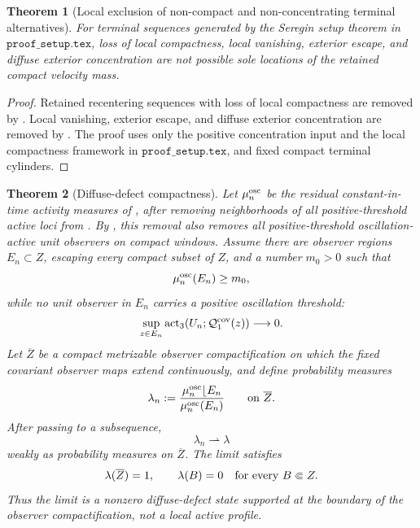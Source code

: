 \documentclass[11pt]{amsart}
\numberwithin{equation}{section}
\theoremstyle{plain}
\newtheorem{theorem}{Theorem}[section]
\theoremstyle{definition}
\theoremstyle{remark}
\newcommand{\actthree}{\operatorname{act}_3}
\begin{document}
\begin{theorem}[Local exclusion of non-compact and non-concentrating terminal alternatives]
\label{thm:terminal-nonactive-discharge}
For terminal sequences generated by the Seregin setup theorem in
\(\texttt{proof\_setup.tex}\), loss of local compactness, local vanishing,
exterior escape, and
diffuse exterior concentration are not possible sole locations of the retained
compact velocity mass.
\end{theorem}

\begin{proof}
Retained recentering sequences with loss of local compactness are removed by
.  Local vanishing, exterior escape, and
diffuse exterior concentration are removed by
.  The proof uses only the positive
concentration input and the local compactness framework in
\(\texttt{proof\_setup.tex}\), and fixed compact terminal cylinders.
\end{proof}

\begin{theorem}[Diffuse-defect compactness]
\label{thm:diffuse-defect-compactness}
Let \(\mu_n^{\rm osc}\) be the residual constant-in-time activity measures
of , after removing neighborhoods of all
positive-threshold active loci from .  By
, this removal also removes all
positive-threshold oscillation-active unit observers on compact windows.
Assume there are observer regions \(E_n\subset Z\), escaping every compact
subset of \(Z\), and a number \(m_0>0\) such that
\[
   \mu_n^{\rm osc}(E_n)\ge m_0 ,
\]
while no unit observer in \(E_n\) carries a positive oscillation threshold:
\[
   \sup_{z\in E_n}
      \actthree(U_n;\mathcal Q_1^{\rm cov}(z))
   \longrightarrow0 .
\]
Let \(\overline Z\) be a compact metrizable observer compactification on which
the fixed covariant observer maps extend continuously, and define probability
measures
\[
   \lambda_n
   :=
   \frac{\mu_n^{\rm osc}\lfloor E_n}{\mu_n^{\rm osc}(E_n)}
   \qquad\hbox{on }\overline Z .
\]
After passing to a subsequence,
\[
   \lambda_n\rightharpoonup\lambda
\]
weakly as probability measures on \(\overline Z\).  The limit satisfies
\[
   \lambda(\overline Z)=1,\qquad
   \lambda(B)=0\quad\hbox{for every }B\Subset Z .
\]
Thus the limit is a nonzero diffuse-defect state supported at the boundary of
the observer compactification, not a local active profile.
\end{theorem}
\end{document}
